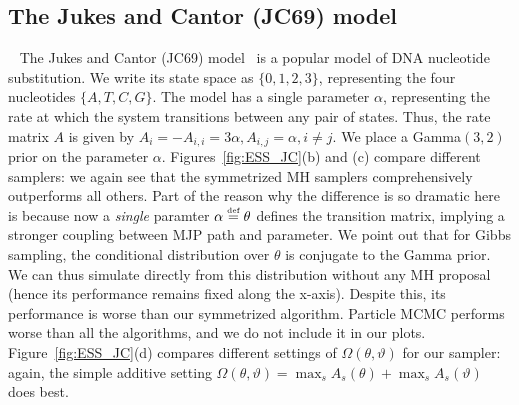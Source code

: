   \subsection{The Jukes and Cantor (JC69) model}~
  The Jukes and Cantor (JC69) model~\citep{jukescantor69} is a popular model of DNA nucleotide substitution.  
  We write its state space as $\{0, 1, 2, 3\}$, representing the four nucleotides $\{A, T, C, G\}$.  
  The model has a single parameter $\alpha$, representing the rate at which the system transitions between any pair of states. 
  Thus, the rate matrix $A$ is given by $A_i = -A_{i,i} = 3\alpha, A_{i, j} = \alpha,i \neq j.$
We place a Gamma$(3,2)$ prior on the parameter $\alpha$.
Figures~\ref{fig:ESS_JC}(b) and (c) compare different samplers: we again see that the symmetrized MH samplers comprehensively outperforms all others.
Part of the reason why the difference is so dramatic here is because now a {\em single} paramter $\alpha \defeq \theta$ defines the transition matrix, implying a stronger coupling between MJP path and parameter. 
We point out that for Gibbs sampling, the conditional distribution over $\theta$ is conjugate to the Gamma prior. We can thus simulate directly from this distribution without any MH proposal (hence its performance remains fixed along the x-axis). 
Despite this, its performance is worse than our symmetrized algorithm.
Particle MCMC performs worse than all the algorithms, and we do not include it in our plots.
Figure~\ref{fig:ESS_JC}(d) compares different settings of $\Omega(\theta,\vartheta)$ for our sampler: again, the simple additive setting $\Omega(\theta,\vartheta) = \max_s A_s(\theta) + \max_s A_s(\vartheta)$ does best.

